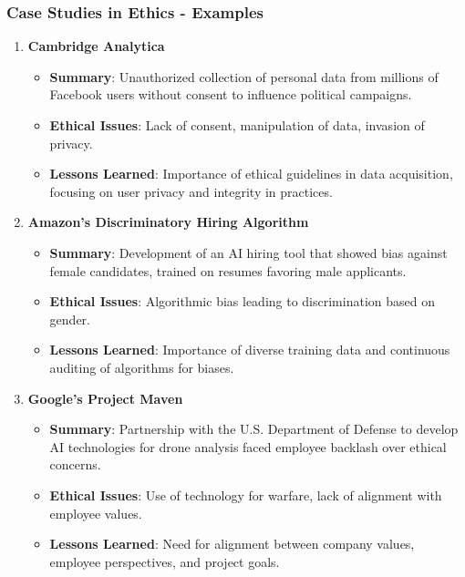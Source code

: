 \documentclass[aspectratio=169]{beamer}
\begin{document}
\begin{frame}[fragile]
    \frametitle{Case Studies in Ethics - Examples}
    \begin{enumerate}
        \item \textbf{Cambridge Analytica}
            \begin{itemize}
                \item \textbf{Summary}: Unauthorized collection of personal data from millions of Facebook users without consent to influence political campaigns.
                \item \textbf{Ethical Issues}: Lack of consent, manipulation of data, invasion of privacy.
                \item \textbf{Lessons Learned}: Importance of ethical guidelines in data acquisition, focusing on user privacy and integrity in practices.
            \end{itemize}

        \item \textbf{Amazon's Discriminatory Hiring Algorithm}
            \begin{itemize}
                \item \textbf{Summary}: Development of an AI hiring tool that showed bias against female candidates, trained on resumes favoring male applicants.
                \item \textbf{Ethical Issues}: Algorithmic bias leading to discrimination based on gender.
                \item \textbf{Lessons Learned}: Importance of diverse training data and continuous auditing of algorithms for biases.
            \end{itemize}

        \item \textbf{Google’s Project Maven}
            \begin{itemize}
                \item \textbf{Summary}: Partnership with the U.S. Department of Defense to develop AI technologies for drone analysis faced employee backlash over ethical concerns.
                \item \textbf{Ethical Issues}: Use of technology for warfare, lack of alignment with employee values.
                \item \textbf{Lessons Learned}: Need for alignment between company values, employee perspectives, and project goals.
            \end{itemize}
    \end{enumerate}
\end{frame}
\end{document}
